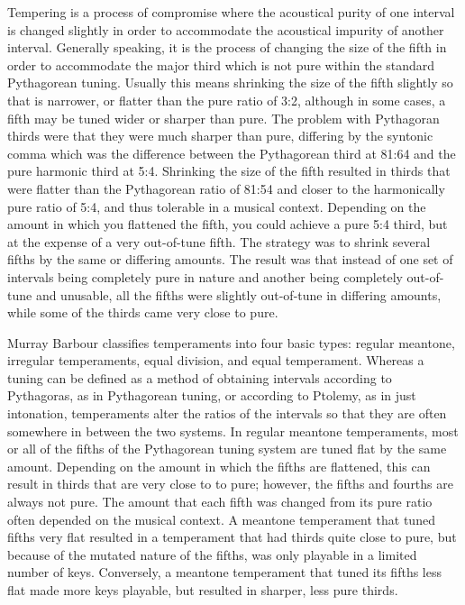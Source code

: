 Tempering is a process of compromise where the acoustical purity of one interval
is changed slightly in order to accommodate the acoustical impurity of another
interval.  Generally speaking, it is the process of changing the size of the fifth in
order to accommodate the major third which is not pure within the standard
Pythagorean tuning. Usually this means shrinking the size of the fifth slightly
so that is narrower, or flatter than the pure ratio of 3:2, although in some
cases, a fifth may be tuned wider or sharper than pure. The problem with
Pythagoran thirds were that they were much sharper than pure, differing by the
syntonic comma which was the difference between the Pythagorean third at 81:64
and the pure harmonic third at 5:4. Shrinking the size of the fifth resulted in
thirds that were flatter than the Pythagorean ratio of 81:54 and closer to the harmonically
pure ratio of 5:4, and thus tolerable
in a musical context.  Depending on the amount in which you flattened the fifth, you
could achieve a pure 5:4 third, but at the expense of a very out-of-tune fifth.  The
strategy was to shrink several fifths by the same or differing amounts. The result
was that instead of one set of intervals being completely pure in nature and
another being completely out-of-tune and unusable, all the fifths were slightly out-of-tune
in differing amounts, while some of the thirds came very close to pure.

Murray Barbour classifies temperaments into four basic types: regular meantone, irregular
temperaments, equal division, and equal temperament. Whereas a tuning can be defined as a
method of obtaining intervals according to Pythagoras, as in Pythagorean tuning, or
according to Ptolemy, as in just intonation, temperaments alter the ratios of the
intervals so that they are often somewhere in between the two systems. In regular meantone
temperaments, most or all of the fifths of the Pythagorean tuning system are tuned flat by
the same amount.  Depending on the amount in which the fifths are flattened, this can
result in thirds that are very close to to pure; however, the fifths and fourths are
always not pure.  The amount that each fifth was changed from its pure ratio often
depended on the musical context.  A meantone temperament that tuned fifths very flat
resulted in a temperament that had thirds quite close to pure, but because of the mutated
nature of the fifths, was only playable in a limited number of keys.  Conversely, a
meantone temperament that tuned its fifths less flat made more keys playable, but resulted
in sharper, less pure thirds.

